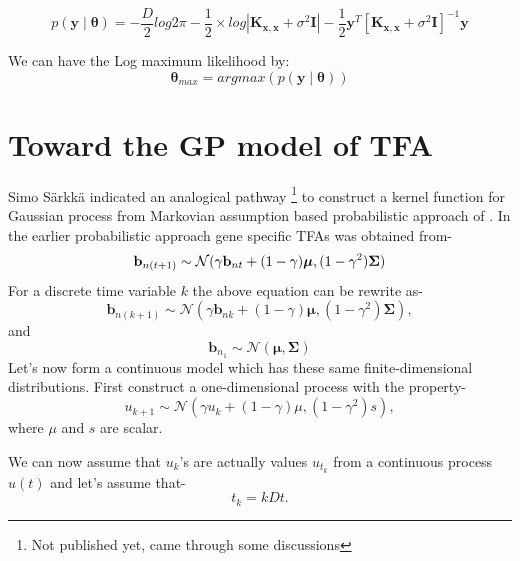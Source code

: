 \begin{equation} \label{eq:Likelihood}
 p \left(\mathbf{y}\middle|\boldsymbol{\theta}\right) =
    - \frac{D}{2}log2\pi - \frac{1}{2}\times log \left| \mathbf{K_{x,x}} + \sigma^2\mathbf{I}\right|
    - \frac{1}{2}\mathbf{y}^T \left[\mathbf{K_{x,x}} + \sigma^2\mathbf{I} \right]^{-1}\mathbf{y}
\end{equation}

We can have the Log maximum likelihood by:
\begin{equation} \label{eq:LML}
 \boldsymbol{\theta}_{max} = argmax \left( p\left(\mathbf{y}\middle|\boldsymbol{\theta}\right) \right)
\end{equation}

\section{Toward the GP model of TFA}
Simo S\"arkk\"a indicated an analogical pathway \footnote{Not published yet, came through some discussions}
to construct a kernel function for Gaussian process from
Markovian assumption based probabilistic approach of \cite{Sanguinetti:2006}.
In the earlier probabilistic approach gene specific TFAs was obtained from-
\begin{equation} \label{eq:tfa_SanG_updateCh4}
  \bold{b}_{n(t+1)} \sim \mathcal{N} (\gamma \bold{b}_{nt} + (1-\gamma)\boldsymbol{\mu},(1-\gamma^2)\bold{\Sigma})
\end{equation}
For a discrete time variable $k$ the above equation can be rewrite as-
\begin{equation}
\textbf{b}_{n(k+1)} \sim \mathcal{N}\left(\gamma \textbf{b}_{nk} + (1 - \gamma) \boldsymbol{\mu}, (1 - \gamma^2) \boldsymbol{\Sigma}\right),
\end{equation}
and
\begin{equation}
\textbf{b}_{n_1} \sim \mathcal{N}\left(\boldsymbol{\mu}, \boldsymbol{\Sigma}\right)
\end{equation}
Let's now form a continuous model which has these same finite-dimensional distributions. 
First construct a one-dimensional process with the property-
\begin{equation}
u_{k+1} \sim \mathcal{N}\left(\gamma u_k + \left(1 - \gamma\right) \mu, (1 - \gamma^2)s \right),
\end{equation}
where $\mu$ and $s$ are scalar.

We can now assume that $u_k$'s are actually values $u_{t_k}$ from a continuous process $u(t)$ and  
let's assume that- 
\begin{equation}
t_k = kDt.
\end{equation}

